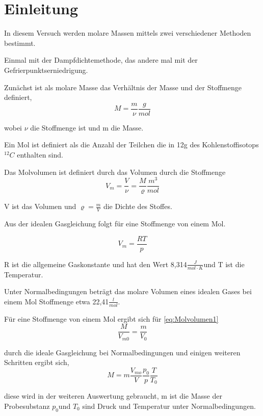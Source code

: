 \section{Einleitung}
In diesem Versuch werden molare Massen mittels zwei verschiedener
Methoden bestimmt.

Einmal mit der Dampfdichtemethode, das andere mal mit der Gefrierpunktserniedrigung.

Zunächst ist als molare Masse das Verhältnis der Masse und der Stoffmenge
definiert,
\begin{equation}
M=\frac{m}{\nu}\frac{g}{mol}\label{eq:Molmasse}
\end{equation}


wobei $\nu$ die Stoffmenge ist und m die Masse.

Ein Mol ist definiert als die Anzahl der Teilchen die in 12g des Kohlenstoffisotops
$^{12}C$ enthalten sind.

Das Molvolumen ist definiert durch das Volumen durch die Stoffmenge
\begin{equation}
V_{m}=\frac{V}{\nu}=\frac{M}{\varrho}\frac{m^{3}}{mol}\label{eq:Molvolumen1}
\end{equation}


V ist das Volumen und $\varrho=\frac{m}{V}$ die Dichte des Stoffes.

Aus der idealen Gasgleichung folgt für eine Stoffmenge von einem Mol.

\begin{equation}
V_{m}=\frac{RT}{p}\label{eq:Molvolumen2}
\end{equation}


R ist die allgemeine Gaskonstante und hat den Wert 8,314$\frac{J}{mol\cdot K}$und
T ist die Temperatur.

Unter Normalbedingungen beträgt das molare Volumen eines idealen Gases
bei einem Mol Stoffmenge etwa 22,41$\frac{l}{mol}$. 

Für eine Stoffmenge von einem Mol ergibt sich für \ref{eq:Molvolumen1}
\begin{equation}
\frac{M}{V_{m0}}=\frac{m}{V_{0}}\label{eq:}
\end{equation}


durch die ideale Gasgleichung bei Normalbedingungen und einigen weiteren
Schritten ergibt sich,
\begin{equation}
M=m\frac{V_{mo}}{V}\frac{p_{0}}{p}\frac{T}{T_{0}}\label{eq:dampfMolMasse}
\end{equation}


diese wird in der weiteren Auswertung gebraucht, m ist die Masse der
Probesubstanz $p_{0}$und $T_{0}$ sind Druck und Temperatur unter
Normalbedingungen.

